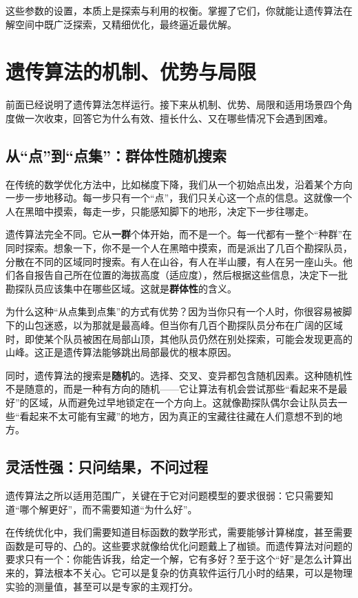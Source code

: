 \documentclass[lang=cn,zihao=-4,a4paper,fontset=windows]{beautybook}
\begin{document}
这些参数的设置，本质上是探索与利用的权衡。掌握了它们，你就能让遗传算法在解空间中既广泛探索，又精细优化，最终逼近最优解。

\section{遗传算法的机制、优势与局限}

前面已经说明了遗传算法怎样运行。接下来从机制、优势、局限和适用场景四个角度做一次收束，回答它为什么有效、擅长什么、又在哪些情况下会遇到困难。

\subsection{从“点”到“点集”：群体性随机搜索}

在传统的数学优化方法中，比如梯度下降，我们从一个初始点出发，沿着某个方向一步一步地移动。每一步只有一个“点”，我们只关心这一个点的信息。这就像一个人在黑暗中摸索，每走一步，只能感知脚下的地形，决定下一步往哪走。

遗传算法完全不同。它从\textbf{一群}个体开始，而不是一个。每一代都有一整个“种群”在同时探索。想象一下，你不是一个人在黑暗中摸索，而是派出了几百个勘探队员，分散在不同的区域同时搜索。有人在山谷，有人在半山腰，有人在另一座山头。他们各自报告自己所在位置的海拔高度（适应度），然后根据这些信息，决定下一批勘探队员应该集中在哪些区域。这就是\textbf{群体性}的含义。

为什么这种“从点集到点集”的方式有优势？因为当你只有一个人时，你很容易被脚下的山包迷惑，以为那就是最高峰。但当你有几百个勘探队员分布在广阔的区域时，即使某个队员被困在局部山顶，其他队员仍然在别处探索，可能会发现更高的山峰。这正是遗传算法能够跳出局部最优的根本原因。

同时，遗传算法的搜索是\textbf{随机}的。选择、交叉、变异都包含随机因素。这种随机性不是随意的，而是一种有方向的随机——它让算法有机会尝试那些“看起来不是最好”的区域，从而避免过早地锁定在一个方向上。这就像勘探队偶尔会让队员去一些“看起来不太可能有宝藏”的地方，因为真正的宝藏往往藏在人们意想不到的地方。

\subsection{灵活性强：只问结果，不问过程}

遗传算法之所以适用范围广，关键在于它对问题模型的要求很弱：它只需要知道“哪个解更好”，而不需要知道“为什么好”。

在传统优化中，我们需要知道目标函数的数学形式，需要能够计算梯度，甚至需要函数是可导的、凸的。这些要求就像给优化问题戴上了枷锁。而遗传算法对问题的要求只有一个：你能告诉我，给定一个解，它有多好？至于这个“好”是怎么计算出来的，算法根本不关心。它可以是复杂的仿真软件运行几小时的结果，可以是物理实验的测量值，甚至可以是专家的主观打分。
\end{document}

